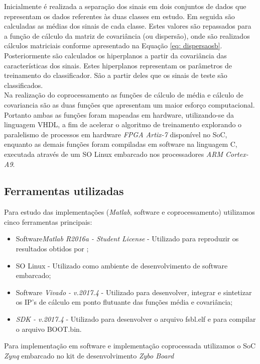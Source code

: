 Inicialmente é realizada a separação dos sinais em dois conjuntos de dados que representam os dados referentes às duas classes em estudo. Em seguida são calculadas as médias dos sinais de cada classe. Estes valores são repassados para a função de cálculo da matriz de covariância (ou dispersão), onde são realizados cálculos matriciais conforme apresentado na Equação \ref{eq: dispersaosb}. Posteriormente são calculados os hiperplanos a partir da covariância das características dos sinais. Estes hiperplanos representam os parâmetros de treinamento do classificador. São a partir deles que os sinais de teste são classificados.\\

Na realização do coprocessamento as funções de cálculo de média e cálculo de covariancia são as duas funções que apresentam um maior esforço computacional. Portanto ambas as funções foram mapeadas em hardware, utilizando-se da linguagem VHDL, a fim de acelerar o algoritmo de treinamento explorando o paralelismo de processos em hardware \textit{FPGA Artix-7} disponível no SoC, enquanto as demais funções foram compiladas em software na linguagem C, executada através de um SO Linux embarcado nos processadores \textit{ARM Cortex-A9}.

\subsection{Ferramentas utilizadas}
Para estudo das implementações (\textit{Matlab}, software e coprocessamento) utilizamos cinco ferramentas principais:\\
\begin{itemize}
	\item Software\textit{Matlab R2016a - \textit{Student License}} - Utilizado para reproduzir os resultados obtidos por \cite{F.Lotte};
	\item SO Linux - Utilizado como ambiente de desenvolvimento de software embarcado;
	\item Software \textit{Vivado - v.2017.4} - Utilizado para desenvolver, integrar e sintetizar os IP's de cálculo em ponto flutuante das funções média e covariância;
	\item \textit{SDK - v.2017.4} - Utilizado para desenvolver o arquivo fsbl.elf e para compilar o arquivo BOOT.bin.
\end{itemize}

Para implementação em software e implementação coprocessada utilizamos o SoC \textit{Zynq} embarcado no kit de desenvolvimento \textit{Zybo Board}

